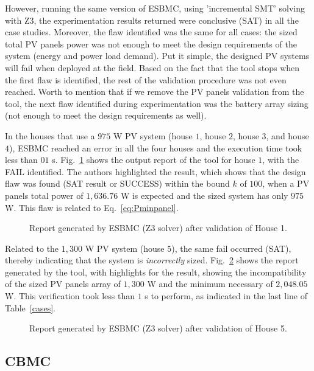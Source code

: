 However, running the same version of ESBMC, using 'incremental SMT' solving with Z3, the experimentation results returned were conclusive (SAT) in all the case studies. Moreover, the flaw identified was the same for all cases: the sized total PV panels power was not enough to meet the design requirements of the system (energy and power load demand). Put it simple, the designed PV systems will fail when deployed at the field. Based on the fact that the tool stops when the first flaw is identified, the rest of the validation procedure was not even reached. Worth to mention that if we remove the PV panels validation from the tool, the next flaw identified during experimentation was the battery array sizing (not enough to meet the design requirements as well).

In the houses that use a $975$ W PV system (house $1$, house $2$, house $3$, and house $4$), ESBMC reached an error in all the four houses and the execution time took less than $01$ s. Fig.~\ref{fig:esbmcverifhouse1} shows the output report of the tool for house $1$, with the FAIL identified. The authors highlighted the result, which shows that the design flaw was found (SAT result or SUCCESS) within the bound $k$ of $100$, when a PV panels total power of $1,636.76$ W is expected and the sized system has only $975$ W. This flaw is related to Eq.~\eqref{eq:Pminpanel}.

\begin{figure}[h]
\centering
\caption{Report generated by ESBMC (Z3 solver) after validation of House 1.}
\label{fig:esbmcverifhouse1}
\end{figure}

Related to the $1,300$ W PV system (house $5$), the same fail occurred (SAT), thereby indicating that the system is \textit{incorrectly} sized. Fig.~\ref{fig:esbmcverifhouse5} shows the report generated by the tool, with highlights for the result, showing the incompatibility of the sized PV panels array of $1,300$ W and the minimum necessary of $2,048.05$W. This verification took less than $1$ s to perform, as indicated in the last line of Table~\ref{cases}.

\begin{figure}[h]
\centering
\caption{Report generated by ESBMC (Z3 solver) after validation of House 5.}
\label{fig:esbmcverifhouse5}
\end{figure}


\subsection{CBMC}

